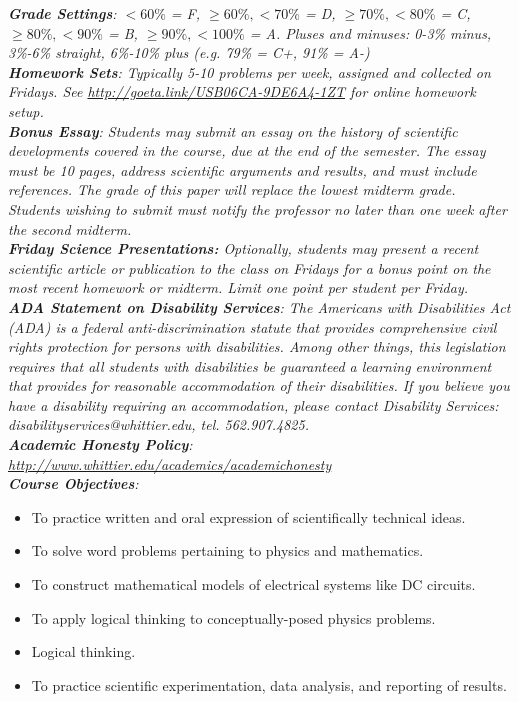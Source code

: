 \documentclass[10pt]{article}
\begin{document}
\textit{\textbf{Grade Settings}: $<60\%$ = F, $\geq 60\%, <70\%$ = D, $\geq 70\%, <80\%$ = C, $\geq 80\%, <90\%$ = B, $\geq 90\%, <100\%$ = A.  Pluses and minuses: 0-3\% minus, 3\%-6\% straight, 6\%-10\% plus (e.g. 79\% = C+, 91\% = A-)} \\
\textit{\textbf{Homework Sets}: Typically 5-10 problems per week, assigned and collected on Fridays.  See \url{http://goeta.link/USB06CA-9DE6A4-1ZT} for online homework setup.} \\
\textit{\textbf{Bonus Essay}: Students may submit an essay on the history of scientific developments covered in the course, due at
the end of the semester. The essay must be 10 pages, address scientific arguments and results, and must include
references. The grade of this paper will replace the lowest midterm grade.  Students wishing to submit must notify the professor no later than one week after the second midterm.} \\
\textit{\textbf{Friday Science Presentations:} Optionally, students may present a recent scientific article or publication to the class on Fridays for a bonus point on the most recent homework or midterm.  Limit one point per student per Friday.} \\
\textit{\textbf{ADA Statement on Disability Services}: The Americans with Disabilities Act (ADA) is a federal anti-discrimination statute that provides comprehensive civil rights protection for persons with disabilities. Among other things, this legislation requires that all students with disabilities be guaranteed a learning environment that provides for reasonable accommodation of their disabilities. If you believe you have a disability requiring an accommodation, please contact Disability Services: disabilityservices@whittier.edu, tel. 562.907.4825.} \\
\textit{\textbf{Academic Honesty Policy}: \url{http://www.whittier.edu/academics/academichonesty}} \\
\textit{\textbf{Course Objectives}:}
\begin{itemize}
\item To practice written and oral expression of scientifically technical ideas.
\item To solve word problems pertaining to physics and mathematics.
\item To construct mathematical models of electrical systems like DC circuits.
\item To apply logical thinking to conceptually-posed physics problems.
\item Logical thinking.
\item To practice scientific experimentation, data analysis, and reporting of results.
\end{itemize}
\end{document}
